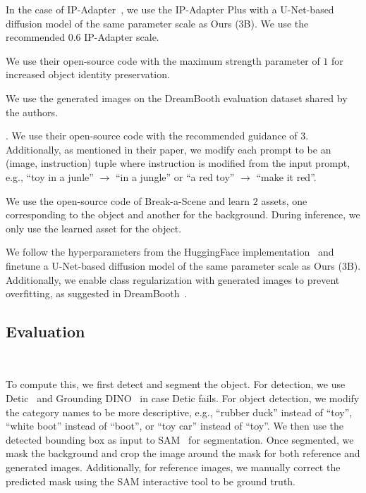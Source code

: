  In the case of IP-Adapter~\cite{ye2023ip}, we use the IP-Adapter Plus with a U-Net-based diffusion model of the same parameter scale as Ours (3B). We use the recommended $0.6$ IP-Adapter scale.

 We use their open-source code with the maximum strength parameter of $1$ for increased object identity preservation. 

 We use the generated images on the DreamBooth evaluation dataset shared by the authors. 

. We use their open-source code with the recommended guidance of $3$. Additionally, as mentioned in their paper, we modify each prompt to be an (image, instruction) tuple where instruction is modified from the input prompt, e.g., ``{\menlo toy in a junle}'' $\rightarrow$ ``{\menlo in a jungle}'' or ``{\menlo a red toy}'' $\rightarrow$ ``{\menlo make it red}''.

 We use the open-source code of Break-a-Scene and learn $2$ assets, one corresponding to the object and another for the background. During inference, we only use the learned asset for the object.

 We follow the hyperparameters from the HuggingFace implementation~\cite{loraimplementation} and finetune a U-Net-based diffusion model of the same parameter scale as Ours (3B). Additionally, we enable class regularization with generated images to prevent overfitting, as suggested in DreamBooth~\cite{ruiz2022dreambooth}. 

\subsection{Evaluation}~

 To compute this, we first detect and segment the object. For detection, we use Detic~\cite{zhou2022detecting} and Grounding DINO~\cite{liu2023grounding} in case Detic fails. For object detection, we modify the category names to be more descriptive, e.g., ``{\menlo rubber duck}'' instead of ``{\menlo toy}'',  ``{\menlo white boot}'' instead of ``{\menlo boot}'', or  ``{\menlo toy car}'' instead of ``{\menlo toy}''. We then use the detected bounding box as input to SAM~\cite{kirillov2023segment} for segmentation. Once segmented, we mask the background and crop the image around the mask for both reference and generated images. Additionally, for reference images, we manually correct the predicted mask using the SAM interactive tool to be ground truth. 


